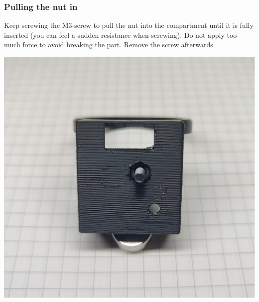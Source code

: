 \documentclass[]{article}
\begin{document}
\subsubsection{Pulling the nut in}
\begin{minipage}[t]{0.5\linewidth}
	\vspace{0pt}
	Keep screwing the M3-screw to pull the nut into the compartment until it is fully inserted (you can feel a sudden resistance when screwing). Do not apply too much force to avoid breaking the part. Remove the screw afterwards.
\end{minipage}
\hfill
\begin{minipage}[t]{0.4\linewidth}
	\vspace{0pt}
	\includegraphics[width=\linewidth]{images/01_displayunit/09_pull_nut.jpg}
\end{minipage}
\end{document}
